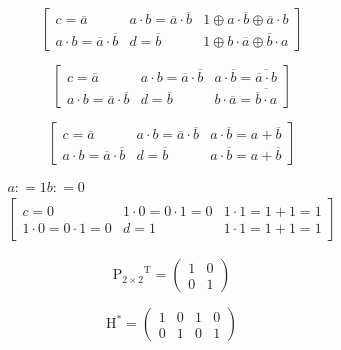 \begin{enumerate}
\begin{enumerate}
\begin{enumerate}
\begin{enumerate}
        \[\begin{bmatrix}
        {c = \overline{a}} & {{a \cdot b} = {\overline{a} \cdot \overline{b}}} & {1 \oplus {a \cdot \overline{b}} \oplus {\overline{a} \cdot b}} \\
        {{a \cdot b} = {\overline{a} \cdot \overline{b}}} & {d = \overline{b}} & {1 \oplus {b \cdot \overline{a}} \oplus {\overline{b} \cdot a}}
        \end{bmatrix}\]

        \[\begin{bmatrix}
        {c = \overline{a}} & {{a \cdot b} = {\overline{a} \cdot \overline{b}}} & {{a \cdot \overline{b}} = \overline{\overline{a}\cdot b}} \\
        {{a \cdot b} = {\overline{a} \cdot \overline{b}}} & {d = \overline{b}} & {{b \cdot \overline{a}} = \overline{\overline{b}\cdot a}}
        \end{bmatrix}\]

        \[\begin{bmatrix}
        {c = \overline{a}} & {{a \cdot b} = {\overline{a} \cdot \overline{b}}} & {{a \cdot \overline{b}} = {a + \overline{b}}} \\
        {{a \cdot b} = {\overline{a} \cdot \overline{b}}} & {d = \overline{b}} & {{a \cdot \overline{b}} = {a + \overline{b}}}
        \end{bmatrix}\]

        \[\begin{matrix}
        {a{: = 1}b{: = 0}} \\
        \begin{bmatrix}
        {c = 0} & {{{1 \cdot 0} = {0 \cdot 1}} = 0} & {{{1 \cdot 1} = {1 + 1}} = 1} \\
        {{{1 \cdot 0} = {0 \cdot 1}} = 0} & {d = 1} & {{{1 \cdot 1} = {1 + 1}} = 1}
        \end{bmatrix}
        \end{matrix}\]

        \[\mathtt{\mathrm{{P_{2 \times 2}}^{\mathtt{\mathbf{\mathrm{T}}}}}} = \begin{pmatrix}
        1 & 0 \\
        0 & 1
        \end{pmatrix}\]

        \[\mathtt{\mathrm{H^{\mathtt{\mathbf{\mathrm{\ast}}}}}} = \begin{pmatrix}
        1 & 0 & 1 & 0 \\
        0 & 1 & 0 & 1
        \end{pmatrix}\]


\end{enumerate}
\end{enumerate}
\end{enumerate}
\end{enumerate}
